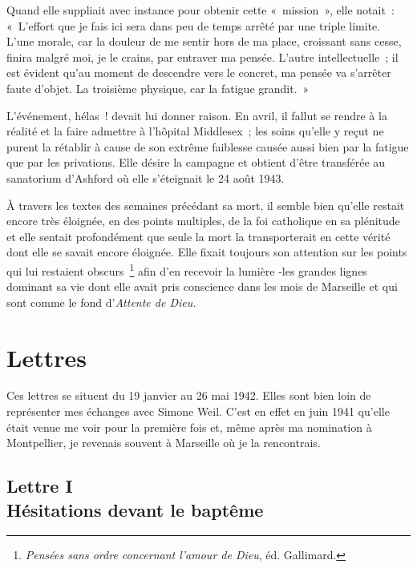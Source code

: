 \documentclass[french,twoside]{book} %
\newcommand{\signed}[1]{\bigbreak\filbreak{\raggedleft #1\par}\medskip}
\newcommand\chapteropen{} %
\newcommand\chaptercont{} %
\newcommand\chapterclose{} %
\begin{document}
Quand elle suppliait avec instance pour obtenir cette « mission », elle notait : « L'effort que je fais ici sera dans peu de temps arrêté par une triple limite. L'une morale, car la douleur de me sentir hors de ma place, croissant sans cesse, finira malgré moi, je le crains, par entraver ma pensée. L'autre intellectuelle ; il est évident qu'au moment de descendre vers le concret, ma pensée va s'arrêter faute d'objet. La troisième physique, car la fatigue grandit. »\par
L'événement, hélas ! devait lui donner raison. En avril, il fallut se rendre à la réalité et la faire admettre à l'hôpital Middlesex ; les soins qu'elle y reçut ne purent la rétablir à cause de son extrême faiblesse causée aussi bien par la fatigue que par les privations. Elle désire la campagne et obtient d'être transférée au sanatorium d'Ashford où elle s'éteignait le 24 août 1943.\par
À travers les textes des semaines précédant sa mort, il semble bien qu'elle restait encore très éloignée, en des points multiples, de la foi catholique en sa plénitude et elle sentait profondément que seule la mort la transporterait en cette vérité dont elle se savait encore éloignée. Elle fixait toujours son attention sur les points qui lui restaient obscurs \footnote{{\itshape Pensées sans ordre concernant l'amour de Dieu}, éd. Gallimard.} afin d'en recevoir la lumière -les grandes lignes dominant sa vie dont elle avait pris conscience dans les mois de Marseille et qui sont comme le fond d'{\itshape Attente de Dieu.}\par


\signed{J.-M. Perrin.}
\chapterclose

\mainmatter 
\chapteropen
\part[{Lettres}]{Lettres}\renewcommand{\leftmark}{Lettres}


\chaptercont
\noindent Ces lettres se situent du 19 janvier au 26 mai 1942. Elles sont bien loin de représenter mes échanges avec Simone Weil. C'est en effet en juin 1941 qu'elle était venue me voir pour la première fois et, même après ma nomination à Montpellier, je revenais souvent à Marseille où je la rencontrais.\par

\chapteropen
\chapter[{Lettre I. Hésitations devant le baptême}]{Lettre I \\
Hésitations devant le baptême}
\end{document}
